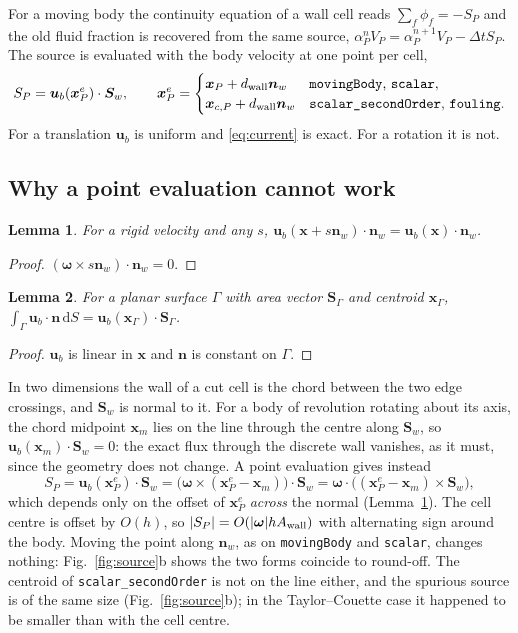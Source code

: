 \documentclass[11pt,a4paper]{article}
\newtheorem{lemma}{Lemma}
\theoremstyle{remark}
\newcommand{\uu}{\bm{u}}
\newcommand{\ub}{\uu_b}
\newcommand{\nn}{\bm{n}}
\newcommand{\xx}{\bm{x}}
\newcommand{\Sw}{\bm{S}_w}
\newcommand{\Aw}{A_{\rm wall}}
\newcommand{\dd}{\,\mathrm{d}}
\newcommand{\code}[1]{\texttt{#1}}
\newcommand{\w}{\bm\omega}
\newcommand{\dt}{\Delta t}
\begin{document}
For a moving body the continuity equation of a wall cell reads $\sum_f\phi_f=-S_P$ and the old
fluid fraction is recovered from the same source, $\alpha^n_PV_P=\alpha^{n+1}_PV_P-\dt S_P$. The
source is evaluated with the body velocity at one point per cell,
\begin{equation}
S_P=\ub(\xx^e_P)\cdot\Sw,\qquad
\xx^e_P=\begin{cases}
\xx_P+d_{\rm wall}\nn_w & \text{\code{movingBody}, \code{scalar}},\\
\xx_{c,P}+d_{\rm wall}\nn_w & \text{\code{scalar\_secondOrder}, \code{fouling}}.
\end{cases}
\label{eq:current}
\end{equation}
For a translation $\ub$ is uniform and \eqref{eq:current} is exact. For a rotation it is not.

\subsection{Why a point evaluation cannot work}

\begin{lemma}
\label{lem:normal}
For a rigid velocity and any $s$, $\ub(\xx+s\nn_w)\cdot\nn_w=\ub(\xx)\cdot\nn_w$.
\end{lemma}
\begin{proof}
$(\w\times s\nn_w)\cdot\nn_w=0$.
\end{proof}

\begin{lemma}
\label{lem:planar}
For a planar surface $\Gamma$ with area vector $\bm S_\Gamma$ and centroid $\xx_\Gamma$,
$\int_\Gamma\ub\cdot\nn\dd S=\ub(\xx_\Gamma)\cdot\bm S_\Gamma$.
\end{lemma}
\begin{proof}
$\ub$ is linear in $\xx$ and $\nn$ is constant on $\Gamma$.
\end{proof}

In two dimensions the wall of a cut cell is the chord between the two edge crossings, and $\Sw$
is normal to it. For a body of revolution rotating about its axis, the chord midpoint $\xx_m$
lies on the line through the centre along $\Sw$, so $\ub(\xx_m)\cdot\Sw=0$: the exact flux
through the discrete wall vanishes, as it must, since the geometry does not change. A point
evaluation gives instead
\begin{equation}
S_P=\ub(\xx^e_P)\cdot\Sw=\big(\w\times(\xx^e_P-\xx_m)\big)\cdot\Sw
=\w\cdot\big((\xx^e_P-\xx_m)\times\Sw\big),
\end{equation}
which depends only on the offset of $\xx^e_P$ \emph{across} the normal (Lemma~\ref{lem:normal}).
The cell centre is offset by $O(h)$, so $|S_P|=O(|\w|h\Aw)$ with alternating sign around the body.
Moving the point along $\nn_w$, as on \code{movingBody} and \code{scalar}, changes nothing:
Fig.~\ref{fig:source}b shows the two forms coincide to round-off. The centroid of
\code{scalar\_secondOrder} is not on the line either, and the spurious source is of the same size
(Fig.~\ref{fig:source}b); in the Taylor--Couette case it happened to be smaller than with the
cell centre.
\end{document}
